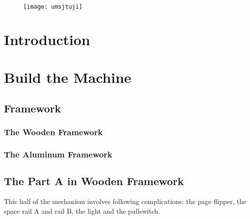 \documentclass[twoside,a4paper]{refart}
\title{\tle}
\author{
Group Bluebear\\
Li Songqian\\
Ruan zhihao\\
Wu Yinyue\\
Zhou Ruixing
}
\begin{document}
\maketitle
\begin{figure}[b]
  \raggedleft
  \texttt{[image: umsjtuji]}\\
\end{figure}
\begin{abstract}
        A Rube Goldberg machine is a intentionally over-designed complex device, which involve a series of units or "complications" that linked together and then trigger one after another with a simple task finished at the end. Our machine is designed for the study room and for the people who enjoy reading. It is able to switch on the light, flip pages of a book and make a tea for the user, with only one trigger. This manual will present you the all the complications in this machines and how to build them.
\end{abstract}




\tableofcontents

\newpage



\section{Introduction}
\section{Build the Machine}
\subsection{Framework}
\subsubsection{The Wooden Framework}
\subsubsection{The Aluminum Framework}
\subsection{The Part A in Wooden Framework}
This half of the mechanism involves following complications: the page flipper, the space rail A and rail B, the light and the pullswitch. 
\end{document}
